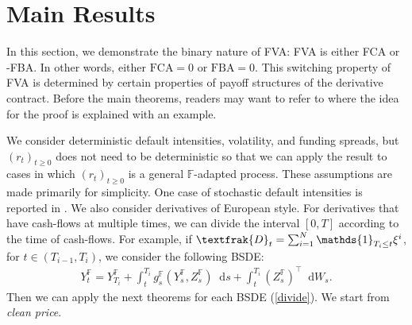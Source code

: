 \documentclass[a4paper, 11pt]{article}              %
\numberwithin{equation}{section}
\theoremstyle{plain}
\newcommand{\1}{\mathds{1}}
\newcommand{\frD}{\textfrak{D}}
\newcommand{\dsF}{\mathbb{F}}
\theoremstyle{plain}
\theoremstyle{definition}
\theoremstyle{plain}
\newcommand*\df{\mathop{}\!\mathrm{d}}
\begin{document}
\section{Main Results} 
\label{sec:main}
In this section, we demonstrate the binary nature of FVA: FVA is either FCA or -FBA. In
other words, either $\text{FCA}=0$ or $\text{FBA}=0$. This switching property of
FVA is determined by certain properties of payoff structures of the derivative
contract. Before the main theorems, readers may want to refer to 
where the idea for the proof is explained with an example.
 
We consider deterministic default intensities, volatility, and funding spreads,
but $(r_t)_{t\geq0}$ does not need to be deterministic so that we can apply the
result to cases in which $(r_t)_{t\geq0}$ is a general $\dsF$-adapted
process. These assumptions are made primarily for simplicity. One case of
stochastic default intensities is reported in .  We also 
consider derivatives of European style.  For derivatives that have cash-flows at
multiple times, we can divide the interval $[0, T]$ according to the time of
cash-flows. For example, if $\frD_t = \sum_{i=1}^N\1_{T_i \leq t}\xi^i$, for
$t \in (T_{i-1}, T_i)$, we consider the following BSDE:
\begin{align}
  Y^\dsF_t = Y^\dsF_{T_i} + \int_{t}^{T_i}g^\dsF_s(Y^\dsF_s , Z^\dsF_s) \df s
  +\int_{t}^{T_i}(Z^\dsF_s)^\top \df W_s. \label{divide}
\end{align}
Then we can apply the next theorems for each BSDE (\ref{divide}). 
 We start from \textit{clean
  price}. 
\end{document}
